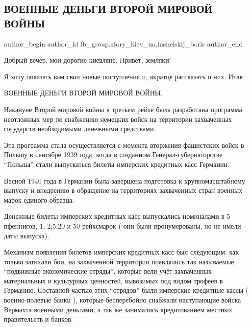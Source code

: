  
 
 
 
 
 
\subsection{ВОЕННЫЕ ДЕНЬГИ ВТОРОЙ МИРОВОЙ ВОЙНЫ}
\label{sec:16_11_2021.fb.fb_group.story_kiev_ua.1.dengi_mirvojna2}
 
\ifcmt
 author_begin
   author_id fb_group.story_kiev_ua,lushelskij_boris
 author_end
\fi

Добрый вечер, мои дорогие киевляне. Привет, земляки!

Я хочу показать вам свои новые поступления и, вкратце рассказать о них. Итак:

ВОЕННЫЕ ДЕНЬГИ ВТОРОЙ МИРОВОЙ ВОЙНЫ.

Накануне Второй мировой войны в третьем рейхе была разработана программа
неотложных мер по снабжению немецких войск на территории захваченных государств
необходимыми денежными средствами.


Эта программа стала осуществляется с момента вторжения фашистских войск в
Польшу в сентябре 1939 года, когда в созданном Генерал-губернаторстве \enquote{Польша}
стали выпускаться билеты имперских кредитных касс Германии.

Весной 1940 года в Германии была завершена подготовка к крупномасштабному
выпуску и внедрению в обращение на территориях захваченных стран военных марок
единого образца.


Денежные билеты имперских кредитных касс выпускались номиналами в 5 пфеннигов,
1; 2;5;20 и 50 рейхсмарок ( они были пронумерованы, но не имели даты выпуска).

Механизм появления билетов имперских кредитных касс был следующим: как только
затихали бои, на захваченной территории появлялись так называемые \enquote{подвижные
экономические отряды}, которые вели учёт захваченных материальных и культурных
ценностей, вывозимых под видом трофеев в Германию. Составной частью этих
\enquote{отрядов} были имперские кредитные кассы ( военно-полевые банки ), которые
бесперебойно  снабжали наступающие войска Вермахта военными деньгами, а так же
занимались кредитованием местных правительств и банков.

